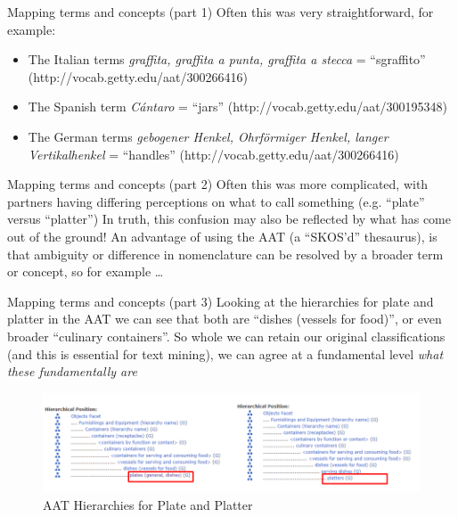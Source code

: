 \documentclass[xcolor=x11names, aspectratio=169,usenames,dvipsnames]{beamer}
\begin{document}
\begin{frame}{Mapping terms and concepts (part 1)}
Often this was very straightforward, for example:
\begin{itemize}
\item The Italian terms \emph{graffita, graffita a punta, graffita a stecca} = \enquote{sgraffito} (http://vocab.getty.edu/aat/300266416)
\item The Spanish term \emph{Cántaro} = \enquote{jars} (http://vocab.getty.edu/aat/300195348)
\item The German terms \emph{gebogener Henkel, Ohrförmiger Henkel, langer Vertikalhenkel} = \enquote{handles} (http://vocab.getty.edu/aat/300266416)
\end{itemize}
\end{frame}

\begin{frame}{Mapping terms and concepts (part 2)}
Often this was more complicated, with partners having differing perceptions on what to call something (e.g. \enquote{plate} versus \enquote{platter})\newline
\newline
In truth, this confusion may also be reflected by what has come out of the ground!\newline
\newline
An advantage of using the AAT (a \enquote{SKOS'd} thesaurus), is that ambiguity or difference in nomenclature can be resolved by  a broader term or concept, so for example \dots
\end{frame}

\begin{frame}{Mapping terms and concepts (part 3)}
Looking at the hierarchies for plate and platter in the AAT we can see that both are \enquote{dishes (vessels for food)}, or even broader \enquote{culinary containers}. So whole we can retain our original classifications (and this is essential for text mining), we can agree at a fundamental level \emph{what these fundamentally are}
\begin{center}
\begin{figure}
\includegraphics[width=\textwidth]{img/tim_hierarchy_plate.png}
\caption{AAT Hierarchies for Plate and Platter}
\end{figure}
\end{center}
\end{frame}
\end{document}
